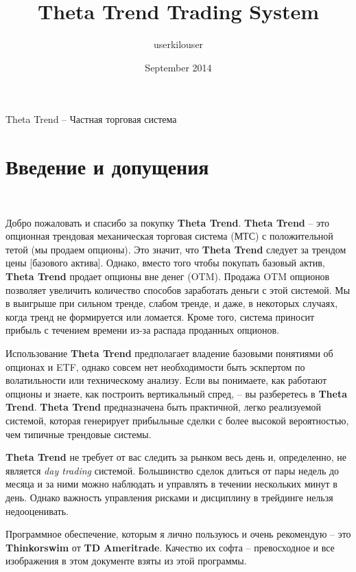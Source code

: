 \documentclass[12pt,DIV=18]{scrartcl}
\title{Theta Trend Trading System}
\author{userkilouser}
\date{September 2014}
\begin{document}
\maketitle
Theta Trend -- Частная торговая система


\tableofcontents

\section*{Введение и допущения}
\label{intro}
\textcolor{White}{.}

Добро пожаловать и спасибо за покупку \textbf{Theta Trend}. \textbf{Theta Trend} -- это опционная трендовая механическая торговая система (МТС) с положительной тетой (мы продаем опционы). Это значит, что \textbf{Theta Trend} следует за трендом цены [базового актива]. Однако, вместо того чтобы покупать базовый актив, \textbf{Theta Trend} продает опционы вне денег (OTM). Продажа OTM опционов позволяет увеличить количество способов заработать деньги с этой системой. Мы в выигрыше при сильном тренде, слабом тренде, и даже, в некоторых случаях, когда тренд не формируется или ломается. Кроме того, система приносит прибыль с течением времени из-за распада проданных опционов.

\bigskip

Использование \textbf{Theta Trend} предполагает владение базовыми понятиями об опционах и ETF, однако совсем нет необходимости быть эскпертом по волатильности или техническому анализу. Если вы понимаете, как работают опционы и знаете, как построить вертикальный спред, -- вы разберетесь в \textbf{Theta Trend}. \textbf{Theta Trend} предназначена быть практичной, легко реализуемой системой, которая генерирует прибыльные сделки с более высокой вероятностью, чем типичные трендовые системы.

\bigskip

\textbf{Theta Trend} не требует от вас следить за рынком весь день и, определенно, не является \textit{day trading} системой. Большинство сделок длиться от пары недель до месяца и за ними можно наблюдать и управлять в течении нескольких минут в день. Однако важность управления рисками и дисциплину в трейдинге нельзя недооценивать.

\bigskip

Программное обеспечение, которым я лично пользуюсь и очень рекомендую -- это \textbf{Thinkorswim} от \textbf{TD Ameritrade}. Качество их софта -- превосходное и все изображения в этом документе взяты из этой программы.
\end{document}
